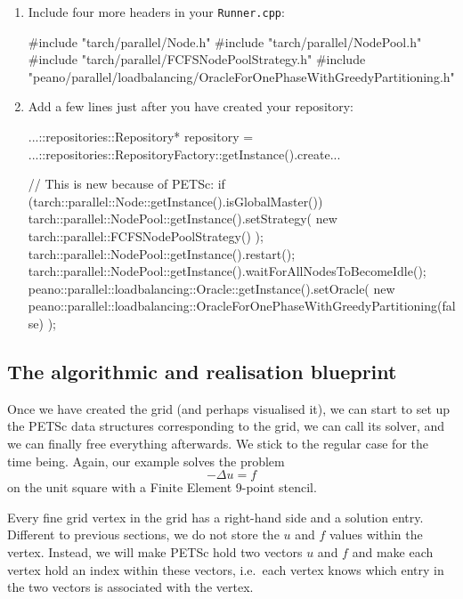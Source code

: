\begin{enumerate}
  \item Include four more headers in your \texttt{Runner.cpp}:
  \begin{code}
#include "tarch/parallel/Node.h"
#include "tarch/parallel/NodePool.h"
#include "tarch/parallel/FCFSNodePoolStrategy.h"
#include "peano/parallel/loadbalancing/OracleForOnePhaseWithGreedyPartitioning.h"
  \end{code}
  \item Add a few lines just after you have created your repository:
\begin{code}
  ...::repositories::Repository* repository = 
    ...::repositories::RepositoryFactory::getInstance().create...

  // This is new because of PETSc:
  if (tarch::parallel::Node::getInstance().isGlobalMaster()) {
    tarch::parallel::NodePool::getInstance().setStrategy(
      new tarch::parallel::FCFSNodePoolStrategy()
    );
  }
  tarch::parallel::NodePool::getInstance().restart();
  tarch::parallel::NodePool::getInstance().waitForAllNodesToBecomeIdle();
  peano::parallel::loadbalancing::Oracle::getInstance().setOracle(
    new peano::parallel::loadbalancing::OracleForOnePhaseWithGreedyPartitioning(false)
  );
\end{code}
\end{enumerate}




\subsection{The algorithmic and realisation blueprint}

Once we have created the grid (and perhaps visualised it), we can start to set
up the PETSc data structures corresponding to the grid, we can call its solver,
and we can finally free everything afterwards.
We stick to the regular case for the time being.
Again, our example solves the problem
\[
-\Delta u = f
\]
on the unit square with a Finite Element 9-point stencil.


Every fine grid vertex in the grid has a right-hand side and a solution entry. 
Different to previous sections, we do not store the $u$ and $f$ values within
the vertex.
Instead, we will make PETSc hold two vectors $u$ and $f$ and
make each vertex hold an index within these vectors, i.e.~each vertex knows
which entry in the two vectors is associated with the vertex.


